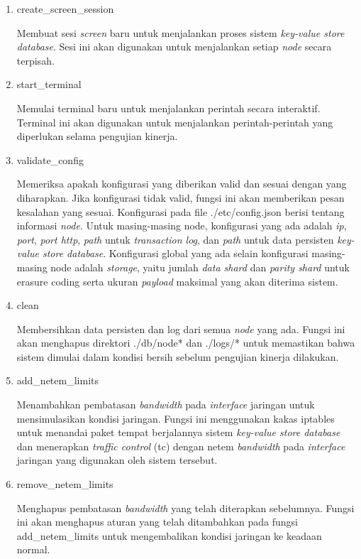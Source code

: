 \begin{enumerate}
  \item create\_screen\_session

  Membuat sesi \textit{screen} baru untuk menjalankan proses sistem \textit{key-value store database}. Sesi ini akan digunakan untuk menjalankan setiap \textit{node} secara terpisah.

  \item start\_terminal

  Memulai terminal baru untuk menjalankan perintah secara interaktif. Terminal ini akan digunakan untuk menjalankan perintah-perintah yang diperlukan selama pengujian kinerja.

  \item validate\_config

  Memeriksa apakah konfigurasi yang diberikan valid dan sesuai dengan yang diharapkan. Jika konfigurasi tidak valid, fungsi ini akan memberikan pesan kesalahan yang sesuai. Konfigurasi pada file ./etc/config.json berisi tentang informasi \textit{node}. Untuk masing-masing node, konfigurasi yang ada adalah \textit{ip}, \textit{port}, \textit{port http}, \textit{path} untuk \textit{transaction log}, dan \textit{path} untuk data persisten \textit{key-value store database}. Konfigurasi global yang ada selain konfigurasi masing-masing node adalah \textit{storage}, yaitu jumlah \textit{data shard} dan \textit{parity shard} untuk erasure coding serta ukuran \textit{payload} maksimal yang akan diterima sistem.

  \item clean

  Membersihkan data persisten dan log dari semua \textit{node} yang ada. Fungsi ini akan menghapus direktori ./db/node* dan ./logs/* untuk memastikan bahwa sistem dimulai dalam kondisi bersih sebelum pengujian kinerja dilakukan.

  \item add\_netem\_limits

  Menambahkan pembatasan \textit{bandwidth} pada \textit{interface} jaringan untuk mensimulasikan kondisi jaringan. Fungsi ini menggunakan kakas iptables untuk menandai paket tempat berjalannya sistem \textit{key-value store database} dan menerapkan \textit{traffic control} (tc) dengan netem \textit{bandwidth} pada \textit{interface} jaringan yang digunakan oleh sistem tersebut.

  \item remove\_netem\_limits
  
  Menghapus pembatasan \textit{bandwidth} yang telah diterapkan sebelumnya. Fungsi ini akan menghapus aturan yang telah ditambahkan pada fungsi add\_netem\_limits untuk mengembalikan kondisi jaringan ke keadaan normal.
  
\end{enumerate}

